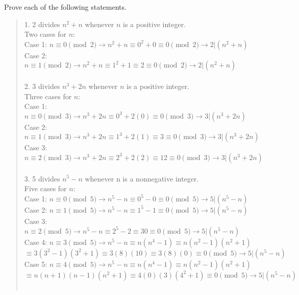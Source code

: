\documentclass[12pt]{article}
\newenvironment{problem}[2][Problem]{\begin{trivlist}
\item[\hskip \labelsep {\bfseries #1}\hskip \labelsep {\bfseries #2.}]}{\end{trivlist}}
\begin{document}
\begin{problem}{6}
    Prove each of the following statements. 
    \begin{quote}
        1. 2 divides $n^2 + n$ whenever $n$ is a positive integer.\\
        Two cases for $n$:\\
        Case 1: $ n \equiv 0 \pmod{2} \rightarrow n^2 + n \equiv 0^2 + 0 \equiv 0 \pmod{2} \rightarrow 2|(n^2 + n)$\\
        Case 2: $ n \equiv 1\pmod{2} \rightarrow n^2 +n \equiv 1^2 + 1 \equiv 2 \equiv 0 \pmod{2} \rightarrow  2|(n^2 + n)$\\\\
        2. 3 divides $n^3+2n$ whenever $n$ is a positive integer.\\
        Three cases for $n$:\\
        Case 1: $n \equiv 0 \pmod{3} \rightarrow n^3 + 2n \equiv 0^3 + 2(0) \equiv 0 \pmod{3} \rightarrow 3|(n^3+2n)$\\ 
        Case 2: $n \equiv 1 \pmod{3} \rightarrow n^3 + 2n \equiv 1^3 + 2(1) \equiv 3 \equiv 0 \pmod{3} \rightarrow 3|(n^3+2n)$\\
        Case 3: $n \equiv 2 \pmod{3} \rightarrow n^3 + 2n \equiv 2^3 + 2(2) \equiv 12 \equiv 0 \pmod{3} \rightarrow 3|(n^3+2n)$\\\\
        3. 5 divides $n^5 - n$ whenever n is a nonnegative integer.\\
        Five cases for $n$:\\
        Case 1: $n \equiv 0 \pmod{5} \rightarrow n^5 - n \equiv 0^5 - 0 \equiv 0 \pmod{5} \rightarrow 5|(n^5-n)$\\
        Case 2: $n \equiv 1 \pmod{5} \rightarrow n^5 - n \equiv 1^5 - 1 \equiv 0 \pmod{5} \rightarrow 5|(n^5-n)$\\
        Case 3: $n \equiv 2 \pmod{5} \rightarrow n^5 - n \equiv 2^5 - 2 \equiv 30 \equiv 0 \pmod{5} \rightarrow 5|(n^5-n)$\\
        Case 4: $n \equiv 3 \pmod{5} \rightarrow n^5 - n \equiv n(n^4 - 1) \equiv n(n^2-1)(n^2+1)$\\
        $\equiv 3(3^2-1)(3^2+1) \equiv 3(8)(10) \equiv 3(8)(0) \equiv 0 \pmod{5} \rightarrow 5|(n^5-n)$\\
        Case 5: $n \equiv 4 \pmod{5} \rightarrow n^5 - n \equiv n(n^4 - 1) \equiv n(n^2-1)(n^2+1)$\\
        $\equiv n(n+1)(n-1)(n^2+1) \equiv 4(0)(3)(4^2+1) \equiv 0 \pmod{5} \rightarrow 5|(n^5-n)$\\\\

\end{quote}
\end{problem}
\end{document}
